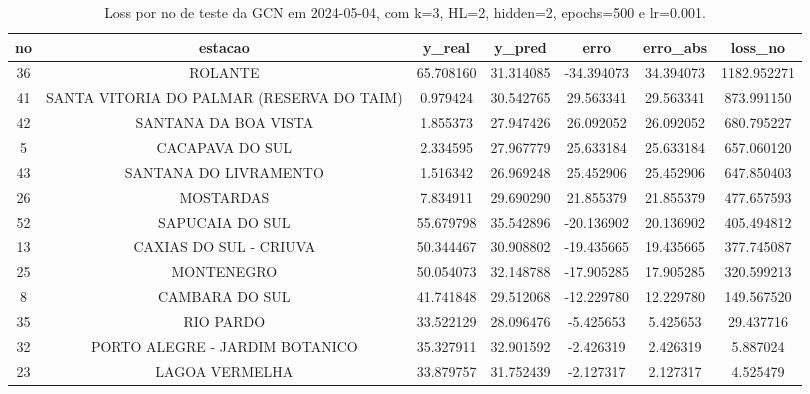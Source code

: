 \begin{table}[h]
\centering
\caption{Loss por no de teste da GCN em 2024-05-04, com k=3, HL=2, hidden=2, epochs=500 e lr=0.001.}
\label{tab:gcn_loss_k3_hl2_h2_e500_d20240504}
\begin{tabular}{ccccccc}
\toprule
no & estacao & y\_real & y\_pred & erro & erro\_abs & loss\_no \\
\midrule
36 & ROLANTE & 65.708160 & 31.314085 & -34.394073 & 34.394073 & 1182.952271 \\
41 & SANTA VITORIA DO PALMAR (RESERVA DO TAIM) & 0.979424 & 30.542765 & 29.563341 & 29.563341 & 873.991150 \\
42 & SANTANA DA BOA VISTA & 1.855373 & 27.947426 & 26.092052 & 26.092052 & 680.795227 \\
5 & CACAPAVA DO SUL & 2.334595 & 27.967779 & 25.633184 & 25.633184 & 657.060120 \\
43 & SANTANA DO LIVRAMENTO & 1.516342 & 26.969248 & 25.452906 & 25.452906 & 647.850403 \\
26 & MOSTARDAS & 7.834911 & 29.690290 & 21.855379 & 21.855379 & 477.657593 \\
52 & SAPUCAIA DO SUL & 55.679798 & 35.542896 & -20.136902 & 20.136902 & 405.494812 \\
13 & CAXIAS DO SUL - CRIUVA & 50.344467 & 30.908802 & -19.435665 & 19.435665 & 377.745087 \\
25 & MONTENEGRO & 50.054073 & 32.148788 & -17.905285 & 17.905285 & 320.599213 \\
8 & CAMBARA DO SUL & 41.741848 & 29.512068 & -12.229780 & 12.229780 & 149.567520 \\
35 & RIO PARDO & 33.522129 & 28.096476 & -5.425653 & 5.425653 & 29.437716 \\
32 & PORTO ALEGRE - JARDIM BOTANICO & 35.327911 & 32.901592 & -2.426319 & 2.426319 & 5.887024 \\
23 & LAGOA VERMELHA & 33.879757 & 31.752439 & -2.127317 & 2.127317 & 4.525479 \\
\bottomrule
\end{tabular}
\end{table}
